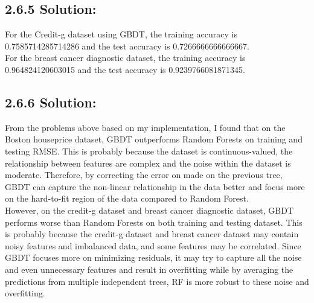 \documentclass{article}
\begin{document}
\subsection*{2.6.5 Solution:}
For the Credit-g dataset using GBDT, the training accuracy is 0.7585714285714286 and the test accuracy is 0.7266666666666667. \\
For the breast cancer diagnostic dataset, the training accuracy is 0.964824120603015 and the test accuracy is 0.9239766081871345.

\subsection*{2.6.6 Solution:}
From the problems above based on my implementation, I found that on the Boston houseprice dataset, GBDT outperforms Random Forests on training and testing RMSE.
This is probably because the dataset is continuous-valued, the relationship between features are complex and the noise within the dataset is moderate. Therefore, by correcting the error on made on the previous tree, GBDT can 
capture the non-linear relationship in the data better and focus more on the hard-to-fit region of the data compared to Random Forest.\\
However, on the credit-g dataset and breast cancer diagnostic dataset, GBDT performs worse than Random Forests on both training and testing dataset. This is probably because the credit-g dataset and breast cancer dataset may
contain noisy features and imbalanced data, and some features may be correlated. Since GBDT focuses more on minimizing residuals, it may try to capture all the noise and even unnecessary features and result in overfitting while by averaging the predictions from multiple independent trees, RF is more robust to these noise and overfitting.
\end{document}
